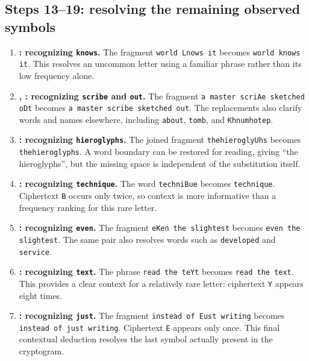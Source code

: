 \subsection{Steps 13--19: resolving the remaining observed symbols}
\begin{enumerate}[resume]
\item \textbf{: recognizing \texttt{knows}.} The fragment \texttt{world Lnows it} becomes \texttt{world knows it}. This resolves an uncommon letter using a familiar phrase rather than its low frequency alone.

\item \textbf{, : recognizing \texttt{scribe} and \texttt{out}.} The fragment \texttt{a master scriAe sketched oDt} becomes \texttt{a master scribe sketched out}. The replacements also clarify words and names elsewhere, including \texttt{about}, \texttt{tomb}, and \texttt{Khnumhotep}.

\item \textbf{: recognizing \texttt{hieroglyphs}.} The joined fragment \texttt{thehieroglyUhs} becomes \texttt{thehieroglyphs}. A word boundary can be restored for reading, giving ``the hieroglyphs'', but the missing space is independent of the substitution itself.

\item \textbf{: recognizing \texttt{technique}.} The word \texttt{techniBue} becomes \texttt{technique}. Ciphertext \texttt{B} occurs only twice, so context is more informative than a frequency ranking for this rare letter.

\item \textbf{: recognizing \texttt{even}.} The fragment \texttt{eKen the slightest} becomes \texttt{even the slightest}. The same pair also resolves words such as \texttt{developed} and \texttt{service}.

\item \textbf{: recognizing \texttt{text}.} The phrase \texttt{read the teYt} becomes \texttt{read the text}. This provides a clear context for a relatively rare letter: ciphertext \texttt{Y} appears eight times.

\item \textbf{: recognizing \texttt{just}.} The fragment \texttt{instead of Eust writing} becomes \texttt{instead of just writing}. Ciphertext \texttt{E} appears only once. This final contextual deduction resolves the last symbol actually present in the cryptogram.
\end{enumerate}
